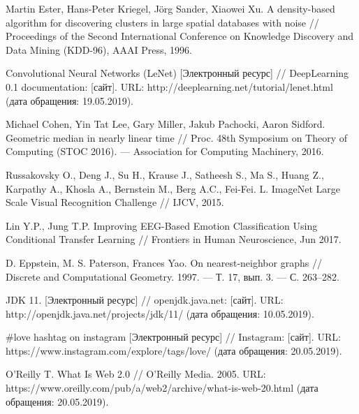 \begingroup 
\renewcommand{\section}[2]{\anonsection{Библиографический список}}
\begin{thebibliography}{00}

    Martin Ester, Hans-Peter Kriegel, Jörg Sander, Xiaowei Xu.
    A density-based algorithm for discovering clusters in large spatial databases with noise // 
    Proceedings of the Second International Conference on Knowledge Discovery and Data Mining (KDD-96),
    AAAI Press, 
    1996.

    Convolutional Neural Networks (LeNet) 
    [Электронный ресурс] // 
    DeepLearning 0.1 documentation: [сайт]. 
    URL: http://deeplearning.net/tutorial/lenet.html 
    (дата обращения: 19.05.2019).

    Michael Cohen, Yin Tat Lee, Gary Miller, Jakub Pachocki, Aaron Sidford. 
    Geometric median in nearly linear time // 
    Proc. 48th Symposium on Theory of Computing (STOC 2016). — Association for Computing Machinery, 
    2016.

    Russakovsky O., Deng J., Su H., Krause J., Satheesh S., Ma S., Huang Z., Karpathy A., Khosla A., Bernstein M., Berg A.C., Fei-Fei. L. 
    ImageNet Large Scale Visual Recognition Challenge // 
    IJCV, 
    2015.

    Lin Y.P., Jung T.P.
    Improving EEG-Based Emotion Classification Using Conditional Transfer Learning //
    Frontiers in Human Neuroscience, 
    Jun 2017.

    D. Eppstein, M. S. Paterson, Frances Yao. 
    On nearest-neighbor graphs // 
    Discrete and Computational Geometry. 
    1997. — Т. 17, вып. 3. — С. 263–282.

    JDK 11.
    [Электронный ресурс] // 
    openjdk.java.net: [сайт]. 
    URL: http://openjdk.java.net/projects/jdk/11/
    (дата обращения: 10.05.2019).

    \#love hashtag on instagram 
    [Электронный ресурс] // 
    Instagram: [сайт]. 
    URL: https://www.instagram.com/explore/tags/love/ 
    (дата обращения: 20.05.2019).

    O'Reilly T. What Is Web 2.0 // 
    O’Reilly Media. 
    2005. 
    URL: https://www.oreilly.com/pub/a/web2/archive/what-is-web-20.html 
    (дата обращения: 20.05.2019).


\end{thebibliography}
